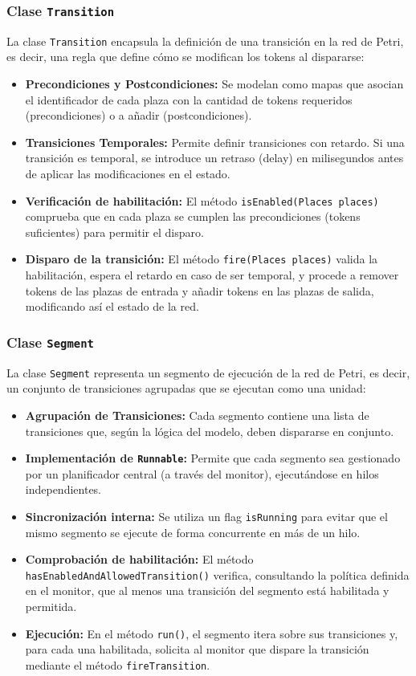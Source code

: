 \documentclass[12pt]{article}
\begin{document}
\subsubsection{Clase \texttt{Transition}}

La clase \texttt{Transition} encapsula la definición de una transición en la red de Petri, es decir, una regla que define cómo se modifican los tokens al dispararse:
\begin{itemize}
    \item \textbf{Precondiciones y Postcondiciones:} Se modelan como mapas que asocian el identificador de cada plaza con la cantidad de tokens requeridos (precondiciones) o a añadir (postcondiciones).
    \item \textbf{Transiciones Temporales:} Permite definir transiciones con retardo. Si una transición es temporal, se introduce un retraso (delay) en milisegundos antes de aplicar las modificaciones en el estado.
    \item \textbf{Verificación de habilitación:} El método \texttt{isEnabled(Places places)} comprueba que en cada plaza se cumplen las precondiciones (tokens suficientes) para permitir el disparo.
    \item \textbf{Disparo de la transición:} El método \texttt{fire(Places places)} valida la habilitación, espera el retardo en caso de ser temporal, y procede a remover tokens de las plazas de entrada y añadir tokens en las plazas de salida, modificando así el estado de la red.
\end{itemize}

\subsubsection{Clase \texttt{Segment}}

La clase \texttt{Segment} representa un segmento de ejecución de la red de Petri, es decir, un conjunto de transiciones agrupadas que se ejecutan como una unidad:
\begin{itemize}
    \item \textbf{Agrupación de Transiciones:} Cada segmento contiene una lista de transiciones que, según la lógica del modelo, deben dispararse en conjunto.
    \item \textbf{Implementación de \texttt{Runnable}:} Permite que cada segmento sea gestionado por un planificador central (a través del monitor), ejecutándose en hilos independientes.
    \item \textbf{Sincronización interna:} Se utiliza un flag \texttt{isRunning} para evitar que el mismo segmento se ejecute de forma concurrente en más de un hilo.
    \item \textbf{Comprobación de habilitación:} El método \texttt{hasEnabledAndAllowedTransition()} verifica, consultando la política definida en el monitor, que al menos una transición del segmento está habilitada y permitida.
    \item \textbf{Ejecución:} En el método \texttt{run()}, el segmento itera sobre sus transiciones y, para cada una habilitada, solicita al monitor que dispare la transición mediante el método \texttt{fireTransition}.
\end{itemize}
\end{document}
